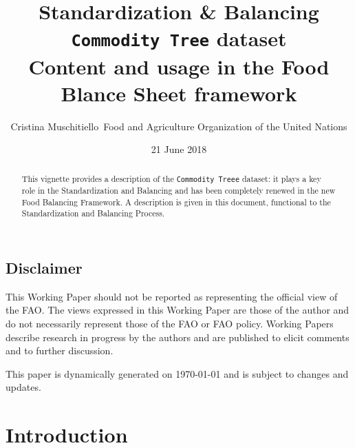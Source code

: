 \documentclass[]{article}
\title{Standardization \& Balancing\\
\texttt{Commodity\ Tree} dataset\\
Content and usage in the Food Blance Sheet framework}
\author{Cristina Muschitiello~Food and Agriculture Organization of the United
Nations}
\date{21 June 2018}
\begin{document}
\maketitle
\begin{abstract}
This vignette provides a description of the \texttt{Commodity\ Treee}
dataset: it plays a key role in the Standardization and Balancing and
has been completely renewed in the new Food Balancing Framework. A
description is given in this document, functional to the Standardization
and Balancing Process.
\end{abstract}

{
\setcounter{tocdepth}{4}
\tableofcontents
}
\newpage

\listoftables

\listoffigures

\subsection*{Disclaimer}\label{disclaimer}

This Working Paper should not be reported as representing the official
view of the FAO. The views expressed in this Working Paper are those of
the author and do not necessarily represent those of the FAO or FAO
policy. Working Papers describe research in progress by the authors and
are published to elicit comments and to further discussion.

This paper is dynamically generated on \today{} and is subject to
changes and updates.

\newpage

\section{Introduction}\label{introduction}
\end{document}
